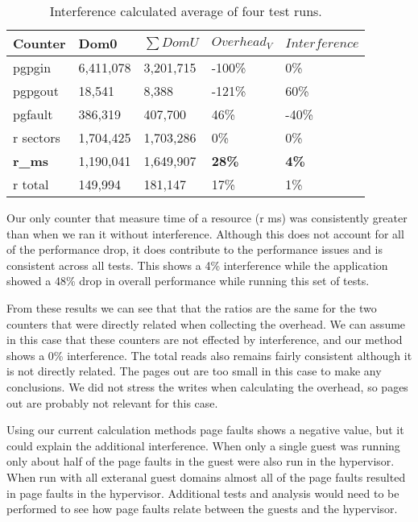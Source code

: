 \begin{table}[h]
\begin{tabular}{ l l l l p{5cm} }
  Counter & Dom0 & $\sum{DomU}$ & $Overhead_V$ & $Interference$ \\
  \hline
pgpgin    & 6,411,078 & 3,201,715 & -100\% & 0\% \\
pgpgout   & 18,541     & 8,388   & -121\%  & 60\%\\
pgfault   & 386,319    & 407,700  & 46\%   & -40\% \\
r sectors & 1,704,425 & 1,703,286 & 0\%    & 0\%\\
\textbf{r\_ms} & 1,190,041 & 1,649,907 & \textbf{28\%} & \textbf{4\%} \\
r total   & 149,994 & 181,147 & 17\%  & 1\% \\
  \hline
\end{tabular}
\caption{Interference calculated average of four test runs.}
\label{fig:InterferenceMed}
\end{table}

Our only counter that measure time of a resource (r ms) was consistently greater than when we ran it
without interference. Although this does not account for all of the performance drop, it does contribute to
the performance issues and is consistent across all tests. This shows a 4\% interference while the application showed a 48\% drop in overall performance while running this set of tests.

From these results we can see that that the ratios are the same for the two counters that were directly
related when collecting the overhead. We can assume in this case that these counters are not effected by
interference, and our method shows a 0\% interference.   The total reads also remains fairly consistent although it is not directly related.  The pages out are too small in this case to make any conclusions.  We did not stress the writes when calculating the overhead, so pages out are probably not relevant for this case. 

Using our current calculation methods page faults shows a negative value, but it could explain the
additional interference. When only a single guest was running only about half of the page faults in the
guest were also run in the hypervisor. When run with all exteranal guest domains almost all of the page faults
resulted in page faults in the hypervisor.  Additional tests and analysis would need to be performed to see how page faults relate between the guests and the hypervisor.

